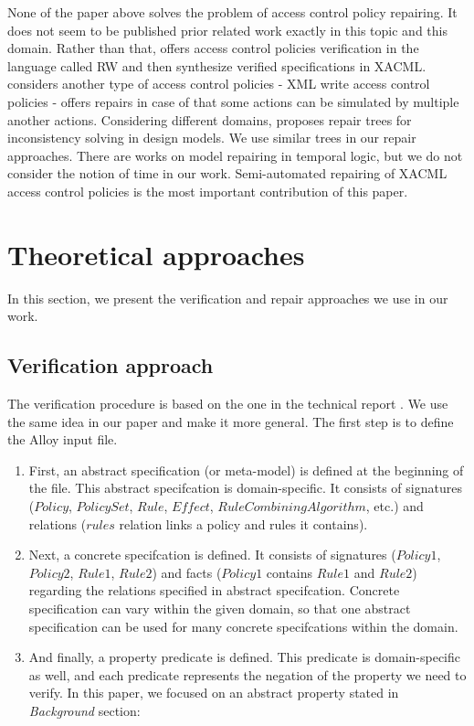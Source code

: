 \documentclass{acm_proc_article-sp}
\begin{document}
None of the paper above solves the problem of access control policy repairing. It does not seem to be published prior related work exactly in this topic and this domain. Rather than that, \cite{Zhang:2004:SVA:1029133.1029141} offers access control policies verification in the language called RW and then synthesize verified specifications in XACML. \cite{Bravo:2007:RIX:1783534.1783545} considers another type of access control policies - XML write access control policies - offers repairs in case of that some actions can be simulated by multiple another actions. Considering different domains, \cite{Reder:2012:CRT:2351676.2351707} proposes repair trees for inconsistency solving in design models. We use similar trees in our repair approaches. There are works on model repairing in temporal logic, but we do not consider the notion of time in our work. Semi-automated repairing of XACML access control policies is the most important contribution of this paper. 

\section{Theoretical approaches}

In this section, we present the verification and repair approaches we use in our work.

\subsection{Verification approach}
\label{sec:verification}

The verification procedure is based on the one in the technical report \cite{acp:alloy}. We use the same idea in our paper and make it more general.
The first step is to define the Alloy input file.

\begin{enumerate}
\item First, an abstract specification  (or meta-model) is defined at the beginning of the file. This abstract specifcation is domain-specific. It consists of signatures ($Policy$, $PolicySet$, $Rule$, $Effect$, $RuleCombiningAlgorithm$, etc.) and relations ($rules$ relation links a policy and rules it contains).

\item Next, a concrete specifcation is defined. It consists of signatures ($Policy1$, $Policy2$, $Rule1$, $Rule2$) and facts ($Policy1$ contains $Rule1$ and $Rule2$) regarding the relations specified in abstract specifcation. Concrete specification can vary within the given domain, so that one abstract specification can be used for many concrete specifcations within the domain.

\item And finally, a property predicate is defined. This predicate is domain-specific as well, and each predicate represents the negation of the property we need to verify. In this paper, we focused on an abstract property stated in \textit{Background} section: 
\end{enumerate}
\end{document}

